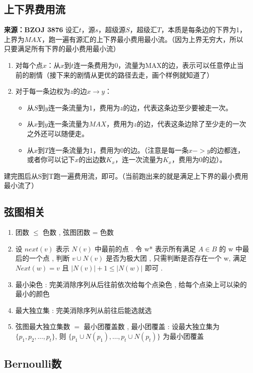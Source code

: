 \documentclass[landscape, oneside, a4paper, cs4size]{book}
\begin{document}
\begin{multicols}{2}
\begin{spacing}{0.72}
\begin{spacing}{0.50}
\begin{spacing}{0.5}
			\subsection*{上下界费用流}
			\noindent \textbf{来源：BZOJ 3876}
			\noindent 设汇$t$，源$s$，超级源$S$，超级汇$T$，本质是每条边的下界为1，上界为$MAX$，跑一遍有源汇的上下界最小费用最小流。（因为上界无穷大，所以只要满足所有下界的最小费用最小流）
			\begin{enumerate}
				\item 对每个点$x$：从$x$到$t$连一条费用为0，流量为MAX的边，表示可以任意停止当前的剧情（接下来的剧情从更优的路径去走，画个样例就知道了）
				\item 对于每一条边权为$z$的边$x \rightarrow y$：
				\begin{itemize}
					\item 从$S$到$y$连一条流量为1，费用为$z$的边，代表这条边至少要被走一次。
					\item 从$x$到$y$连一条流量为$MAX$，费用为$z$的边，代表这条边除了至少走的一次之外还可以随便走。
					\item 从$x$到$T$连一条流量为1，费用为0的边。（注意是每一条$x->y$的边都连，或者你可以记下$x$的出边数$K_x$，连一次流量为$K_x$，费用为0的边）。
				\end{itemize}
			\end{enumerate}
			建完图后从S到T跑一遍费用流，即可。（当前跑出来的就是满足上下界的最小费用最小流了）
			\subsection*{弦图相关}
			\begin{enumerate}
				\item[1.] 团数 $\leq$ 色数 , 弦图团数 = 色数
				\item[2.] 设 $next(v)$ 表示 $N(v)$ 中最前的点 .
				令 w* 表示所有满足 $A \in B$ 的 w 中最后的一个点 ,
				判断 $v \cup N(v)$ 是否为极大团 ,
				只需判断是否存在一个 w,
				满足 $Next(w)=v$ 且 $|N(v)| + 1 \leq |N(w)|$ 即可 .
				\item[3.] 最小染色 : 完美消除序列从后往前依次给每个点染色 ,
				给每个点染上可以染的最小的颜色
				\item[4.] 最大独立集 : 完美消除序列从前往后能选就选
				\item[5.] 弦图最大独立集数 $=$ 最小团覆盖数 ,
				最小团覆盖 :
				设最大独立集为 $\{p_1,p_2, \dots ,p_t\}$,
				则 $\{p_1\cup N(p_1), \dots , p_t \cup N(p_t)\}$
				为最小团覆盖
			\end{enumerate}
			\subsection*{Bernoulli数}
				
        \end{spacing}

\end{spacing}
\end{spacing}
\end{multicols}
\end{document}
